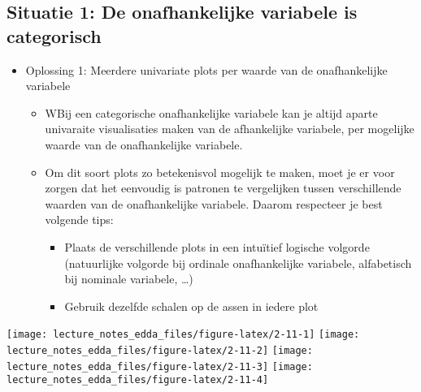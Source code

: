 \documentclass[]{memoir}
\providecommand{\tightlist}{%
  \setlength{\itemsep}{0pt}\setlength{\parskip}{0pt}}
\begin{document}
\hypertarget{situatie-1-de-onafhankelijke-variabele-is-categorisch}{%
\subsection{Situatie 1: De onafhankelijke variabele is categorisch}\label{situatie-1-de-onafhankelijke-variabele-is-categorisch}}

\begin{itemize}
\tightlist
\item
  Oplossing 1: Meerdere univariate plots per waarde van de onafhankelijke variabele

  \begin{itemize}
  \tightlist
  \item
    WBij een categorische onafhankelijke variabele kan je altijd aparte univaraite visualisaties maken van de afhankelijke variabele, per mogelijke waarde van de onafhankelijke variabele.
  \item
    Om dit soort plots zo betekenisvol mogelijk te maken, moet je er voor zorgen dat het eenvoudig is patronen te vergelijken tussen verschillende waarden van de onafhankelijke variabele. Daarom respecteer je best volgende tips:

    \begin{itemize}
    \tightlist
    \item
      Plaats de verschillende plots in een intuïtief logische volgorde (natuurlijke volgorde bij ordinale onafhankelijke variabele, alfabetisch bij nominale variabele, \ldots{})
    \item
      Gebruik dezelfde schalen op de assen in iedere plot
    \end{itemize}
  \end{itemize}
\end{itemize}

\texttt{[image: lecture\_notes\_edda\_files/figure-latex/2-11-1]}
\texttt{[image: lecture\_notes\_edda\_files/figure-latex/2-11-2]}
\texttt{[image: lecture\_notes\_edda\_files/figure-latex/2-11-3]}
\texttt{[image: lecture\_notes\_edda\_files/figure-latex/2-11-4]}
\end{document}

